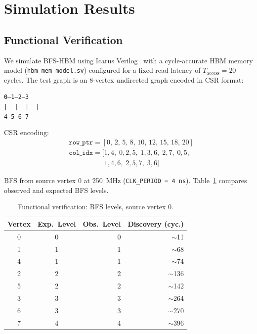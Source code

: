 \section{Simulation Results}
\label{sec:results}

\subsection{Functional Verification}

We simulate BFS-HBM using Icarus Verilog~\cite{williams2002icarus} with a cycle-accurate
HBM memory model (\texttt{hbm\_mem\_model.sv}) configured for a fixed read latency of
$T_\text{access} = 20$ cycles. The test graph is an 8-vertex undirected graph encoded
in CSR format:

\begin{center}
\texttt{0--1--2--3} \\[2pt]
\texttt{|\ \ |\ \ |\ \ |} \\[2pt]
\texttt{4--5--6--7}
\end{center}

CSR encoding:
\begin{align*}
&\mathtt{row\_ptr} = [0,\,2,\,5,\,8,\,10,\,12,\,15,\,18,\,20] \\
&\mathtt{col\_idx} = [1,4,\; 0,2,5,\; 1,3,6,\; 2,7,\; 0,5, \\
&\phantom{\mathtt{col\_idx} = [}1,4,6,\; 2,5,7,\; 3,6]
\end{align*}

BFS from source vertex 0 at 250~MHz (\texttt{CLK\_PERIOD = 4~ns}).
Table~\ref{tab:sim_results} compares observed and expected BFS levels.

\begin{table}[h]
\centering
\caption{Functional verification: BFS levels, source vertex 0.}
\label{tab:sim_results}
\small
\begin{tabular}{@{}ccrr@{}}
\toprule
Vertex & Exp.\ Level & Obs.\ Level & Discovery (cyc.) \\
\midrule
0 & 0 & 0 & $\sim$11 \\
1 & 1 & 1 & $\sim$68 \\
4 & 1 & 1 & $\sim$74 \\
2 & 2 & 2 & $\sim$136 \\
5 & 2 & 2 & $\sim$142 \\
3 & 3 & 3 & $\sim$264 \\
6 & 3 & 3 & $\sim$270 \\
7 & 4 & 4 & $\sim$396 \\
\bottomrule
\end{tabular}
\end{table}

